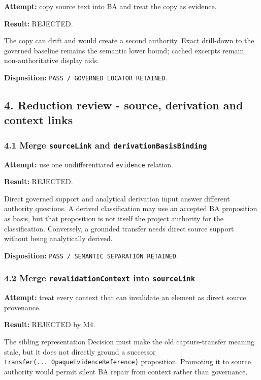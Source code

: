 \documentclass[11pt,a4paper]{article}
\begin{document}
\textbf{Attempt:} copy source text into BA and treat the copy as evidence.

\textbf{Result:} REJECTED.

The copy can drift and would create a second authority. Exact drill-down to the governed baseline remains the semantic lower bound; cached excerpts remain non-authoritative display aids.

\textbf{Disposition:} \texttt{PASS\ /\ GOVERNED\ LOCATOR\ RETAINED}.

\subsection{4. Reduction review - source, derivation and context links}\label{reduction-review---source-derivation-and-context-links}

\subsubsection{\texorpdfstring{4.1 Merge \texttt{sourceLink} and \texttt{derivationBasisBinding}}{4.1 Merge sourceLink and derivationBasisBinding}}\label{merge-sourcelink-and-derivationbasisbinding}

\textbf{Attempt:} use one undifferentiated \texttt{evidence} relation.

\textbf{Result:} REJECTED.

Direct governed support and analytical derivation input answer different authority questions. A derived classification may use an accepted BA proposition as basis, but that proposition is not itself the project authority for the classification. Conversely, a grounded transfer needs direct source support without being analytically derived.

\textbf{Disposition:} \texttt{PASS\ /\ SEMANTIC\ SEPARATION\ RETAINED}.

\subsubsection{\texorpdfstring{4.2 Merge \texttt{revalidationContext} into \texttt{sourceLink}}{4.2 Merge revalidationContext into sourceLink}}\label{merge-revalidationcontext-into-sourcelink}

\textbf{Attempt:} treat every context that can invalidate an element as direct source provenance.

\textbf{Result:} REJECTED by M4.

The sibling representation Decision must make the old capture-transfer meaning stale, but it does not directly ground a successor \texttt{transfer(...\ OpaqueEvidenceReference)} proposition. Promoting it to source authority would permit silent BA repair from context rather than governance.
\end{document}
